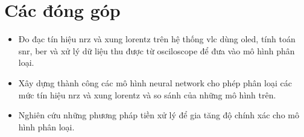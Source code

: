 \section{Các đóng góp}
\begin{itemize}
\item Đo đạc tín hiệu \ac{nrz} và xung lorentz trên hệ thống \ac{vlc} dùng \ac{oled}, tính toán \ac{snr}, \ac{ber} và xử lý dữ liệu thu được từ osciloscope để đưa vào mô hình phân loại.
\item Xây dựng thành công các mô hình neural network cho phép phân loại các mức tín hiệu \ac{nrz} và xung lorentz và so sánh của những mô hình trên.
\item Nghiên cứu những phương pháp tiền xử lý để gia tăng độ chính xác cho mô hình phân loại.
\end{itemize}